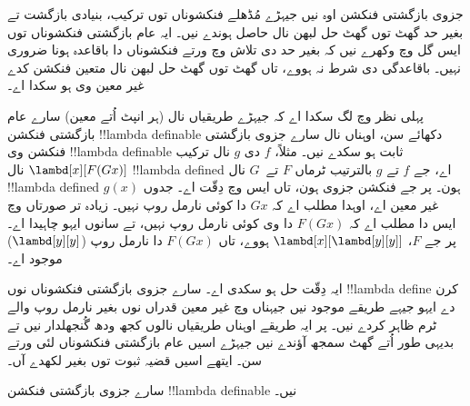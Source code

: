 \documentclass[../../../include/open-logic-section]{subfiles}
\begin{document}

جزوی بازگشتی فنکشن اوہ نیں جیہڑے مُڈھلے فنکشوناں توں
ترکیب، بنیادی بازگشت تے بغیر حد گھٹ توں گھٹ حل لبھن نال
حاصل ہوندے نیں۔ ایہ عام بازگشتی فنکشوناں توں ایس گل وچ
وکھرے نیں کہ بغیر حد دی تلاش وچ ورتے فنکشوناں دا باقاعدہ
ہونا ضروری نہیں۔ باقاعدگی دی شرط نہ ہووے، تاں گھٹ توں
گھٹ حل لبھن نال متعین فنکشن کدے غیر معین وی ہو سکدا اے۔

پہلی نظر وچ لگ سکدا اے کہ جیہڑے طریقیاں نال (ہر انپٹ
اُتے معین) سارے عام بازگشتی فنکشن !!{lambda definable}
دکھائے سن، اوہناں نال سارے جزوی بازگشتی فنکشن وی
!!{lambda definable} ثابت ہو سکدے نیں۔ مثلاً، $f$ دی $g$
نال ترکیب $\lambd[x][F (G x)]$ نال !!{lambda defined} اے،
جے $f$ تے $g$ بالترتیب ٹرماں $F$ تے~$G$ نال
!!{lambda defined} ہون۔ پر جے فنکشن جزوی ہون، تاں ایس
وچ دِقّت اے۔ جدوں $g(x)$ غیر معین اے، اوہدا مطلب اے کہ
$G x$ دا کوئی نارمل روپ نہیں۔ زیادہ تر صورتاں وچ ایس دا
مطلب اے کہ $F (G
x)$ دا وی کوئی نارمل روپ نہیں، تے سانوں ایہو چاہیدا اے۔
پر جے $F$، $\lambd[x][\lambd[y][y]]$ ہووے، تاں $F (G x)$
دا نارمل روپ ($\lambd[y][y]$) موجود اے۔

ایہ دِقّت حل ہو سکدی اے۔ سارے جزوی بازگشتی فنکشوناں نوں
!!{lambda define} کرن دے ایہو جیہے طریقے موجود نیں جیہناں
وچ غیر معین قدراں نوں بغیر نارمل روپ والے ٹرم ظاہر کردے
نیں۔ پر ایہ طریقے اوہناں طریقیاں نالوں کجھ ودھ گُنجھلدار
نیں تے بدیہی طور اُتے گھٹ سمجھ آؤندے نیں جیہڑے اسیں عام
بازگشتی فنکشوناں لئی ورتے سن۔ ایتھے اسیں قضیہ ثبوت توں
بغیر لکھدے آں۔

\begin{thm}
  سارے جزوی بازگشتی فنکشن !!{lambda definable} نیں۔
\end{thm}
\end{document}
